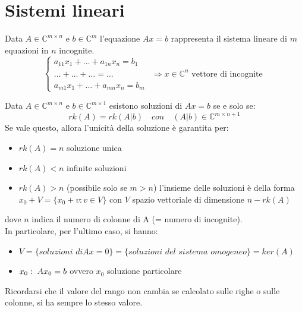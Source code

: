 \documentclass[12pt,a4paper,]{report}
\newcommand{\s}{\hspace{1mm}}
\begin{document}
\section{Sistemi lineari}

\begin{definizione}
    Data $A \in \mathbb{C}^{m\times n}$ e $b \in \mathbb{C}^m$ l'equazione $Ax = b$ rappresenta il sistema lineare di $m$ equazioni in $n$ incognite.
    \[
    \begin{cases}
    a_{11}x_1 + \ldots + a_{1n}x_n = b_1 \\
    \ldots + \ldots + \ldots = \ldots &  \Longrightarrow x \in \mathbb{C}^n \text{ vettore di incognite} \\
    a_{m1}x_1 + \ldots + a_{mn}x_n = b_m
    \end{cases}
    \]
\end{definizione}
\begin{teorema}
    \label{th: Rouche-Capelli}
    Data $A\in \mathbb{C}^{m\times n}$ e $b\in\mathbb{C}^{m\times 1}$ esistono soluzioni di $Ax=b$ se e solo se:
    \[
    rk(A) = rk(A|b) \quad con \quad (A|b)\in\mathbb{C}^{m\times n+1}
    \]
    Se vale questo, allora l'unicità della soluzione è garantita per:
    \begin{itemize}
        \item $rk(A) = n$ soluzione unica
        \item $rk(A) < n$ infinite soluzioni
        \item $rk(A) > n$ (possibile solo se $m>n$) l'insieme delle soluzioni è della forma $x_0 + V = \{x_0 + v : v\in V\}$ con $V$ spazio vettoriale di dimensione $n-rk(A)$
    \end{itemize}
    dove $n$ indica il numero di colonne di A (= numero di incognite).\\
    In particolare, per l'ultimo caso, si hanno:
    \begin{itemize}
        \item $V= \{\textit{soluzioni di} Ax=0\} = \{\textit{soluzioni del sistema omogeneo}\} = ker(A)$
        \item $x_0 : \s Ax_0=b$ ovvero $x_0$ soluzione particolare
    \end{itemize}
\end{teorema}

\begin{nota}
    Ricordarsi che il valore del rango non cambia se calcolato sulle righe o sulle colonne, si ha sempre lo stesso valore.
\end{nota}
\end{document}
